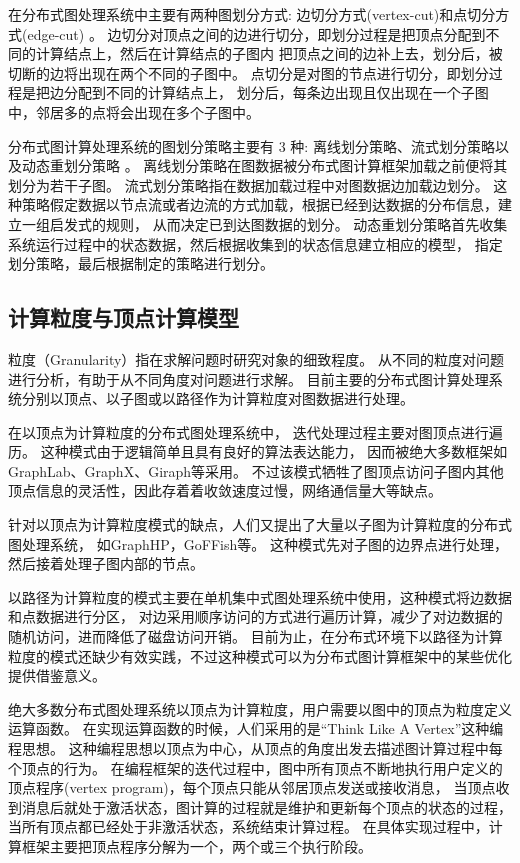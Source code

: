 在分布式图处理系统中主要有两种图划分方式:
边切分方式(vertex-cut)\cite{Gonzalez@OSDI12}和点切分方式(edge-cut) \cite{Malewicz@SIGMOD10}。
边切分对顶点之间的边进行切分，即划分过程是把顶点分配到不同的计算结点上，然后在计算结点的子图内
把顶点之间的边补上去，划分后，被切断的边将出现在两个不同的子图中。
点切分是对图的节点进行切分，即划分过程是把边分配到不同的计算结点上，
划分后，每条边出现且仅出现在一个子图中，邻居多的点将会出现在多个子图中。

分布式图计算处理系统的图划分策略主要有 3 种: 
离线划分策略\cite{metis}、流式划分策略\cite{tsourakakis2014fennel}以及动态重划分策略\cite{kumar2017graphsteal} 。
离线划分策略在图数据被分布式图计算框架加载之前便将其划分为若干子图。
流式划分策略指在数据加载过程中对图数据边加载边划分。
这种策略假定数据以节点流或者边流的方式加载，根据已经到达数据的分布信息，建立一组启发式的规则，
从而决定已到达图数据的划分。
动态重划分策略首先收集系统运行过程中的状态数据，然后根据收集到的状态信息建立相应的模型，
指定划分策略，最后根据制定的策略进行划分。

\subsection{计算粒度与顶点计算模型}

粒度（Granularity）指在求解问题时研究对象的细致程度。
从不同的粒度对问题进行分析，有助于从不同角度对问题进行求解。
目前主要的分布式图计算处理系统分别以顶点、以子图或以路径作为计算粒度对图数据进行处理。
    
在以顶点为计算粒度的分布式图处理系统中，
迭代处理过程主要对图顶点进行遍历。
这种模式由于逻辑简单且具有良好的算法表达能力，
因而被绝大多数框架如GraphLab\cite{Low@12}、GraphX\cite{Gonzalez@OSDI14}、Giraph\cite{Avery@HS11}等采用。
不过该模式牺牲了图顶点访问子图内其他顶点信息的灵活性，因此存着着收敛速度过慢，网络通信量大等缺点。

针对以顶点为计算粒度模式的缺点，人们又提出了大量以子图为计算粒度的分布式图处理系统，
如GraphHP\cite{su2016graphhp}，GoFFish\cite{goffish}等。
这种模式先对子图的边界点进行处理，然后接着处理子图内部的节点。

以路径为计算粒度的模式主要在单机集中式图处理系统中使用，这种模式将边数据和点数据进行分区，
对边采用顺序访问的方式进行遍历计算，减少了对边数据的随机访问，进而降低了磁盘访问开销。
目前为止，在分布式环境下以路径为计算粒度的模式还缺少有效实践，不过这种模式可以为分布式图计算框架中的某些优化提供借鉴意义。

绝大多数分布式图处理系统以顶点为计算粒度，用户需要以图中的顶点为粒度定义运算函数。
在实现运算函数的时候，人们采用的是“Think Like A Vertex”\cite{TLV}这种编程思想。
这种编程思想以顶点为中心，从顶点的角度出发去描述图计算过程中每个顶点的行为。
在编程框架的迭代过程中，图中所有顶点不断地执行用户定义的顶点程序(vertex program)，每个顶点只能从邻居顶点发送或接收消息，
当顶点收到消息后就处于激活状态，图计算的过程就是维护和更新每个顶点的状态的过程，当所有顶点都已经处于非激活状态，系统结束计算过程。
在具体实现过程中，计算框架主要把顶点程序分解为一个，两个或三个执行阶段。

